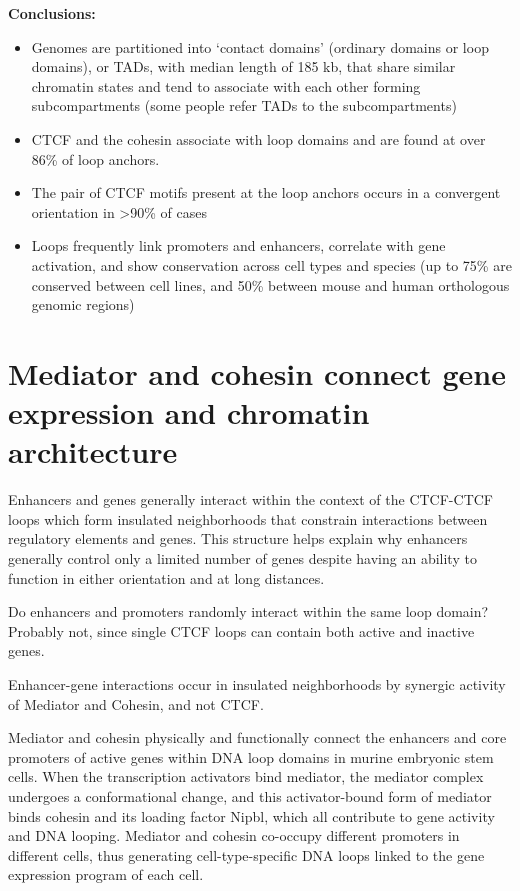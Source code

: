 \textbf{Conclusions:}

\begin{itemize}
\tightlist
\item
  Genomes are partitioned into `contact domains' (ordinary domains or loop domains), or TADs, with median length of 185 kb, that share similar chromatin states and tend to associate with each other forming subcompartments (some people refer TADs to the subcompartments)
\item
  CTCF and the cohesin associate with loop domains and are found at over 86\% of loop anchors.
\item
  The pair of CTCF motifs present at the loop anchors occurs in a convergent orientation in \textgreater90\% of cases
\item
  Loops frequently link promoters and enhancers, correlate with gene activation, and show conservation across cell types and species (up to 75\% are conserved between cell lines, and 50\% between mouse and human orthologous genomic regions)
\end{itemize}

\section{Mediator and cohesin connect gene expression and chromatin architecture}

Enhancers and genes generally interact within the context of the CTCF-CTCF loops which form insulated neighborhoods that constrain interactions between regulatory elements and genes.
This structure helps explain why enhancers generally control only a limited number of genes despite having an ability to function in either orientation and at long distances.

Do enhancers and promoters randomly interact within the same loop domain? Probably not, since single CTCF loops can contain both active and inactive genes.

Enhancer-gene interactions occur in insulated neighborhoods by synergic activity of Mediator and Cohesin, and not CTCF.

Mediator and cohesin physically and functionally connect the enhancers and core promoters of active genes within DNA loop domains in murine embryonic stem cells. When the transcription activators bind mediator, the mediator complex undergoes a conformational change, and this activator-bound form of mediator binds cohesin and its loading factor Nipbl, which all contribute to gene activity and DNA looping. Mediator and cohesin co-occupy different promoters in different cells, thus generating cell-type-specific DNA loops linked to the gene expression program of each cell.

